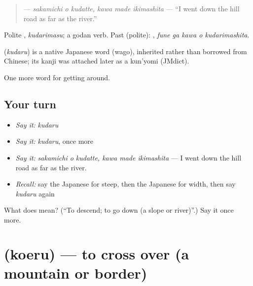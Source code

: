 \begin{quote}
\textbf{  } — \emph{sakamichi o kudatte, kawa made ikimashita} — \textquotedblleft{}I went down the hill road as far as the river.\textquotedblright{}
\end{quote}

Polite \textbf{}, \emph{kudarimasu}; a godan verb. Past (polite): \textbf{  }, \emph{fune ga kawa o kudarimashita}.

\begin{cousinweb}
\textbf{} (\emph{kudaru}) is a native Japanese word (wago), inherited rather than borrowed from Chinese; its kanji was attached later as a kun'yomi (JMdict).
\end{cousinweb}

\begin{grammarlens}[title={What you've built}]
One more word for getting around.
\end{grammarlens}

\subsection*{Your turn}
\begin{itemize}
\raggedright
  \item \emph{Say it:} \emph{kudaru}
  \item \emph{Say it:} \emph{kudaru}, once more
  \item \emph{Say it:} \emph{sakamichi o kudatte, kawa made ikimashita} — I went down the hill road as far as the river.
  \item \emph{Recall:} say the Japanese for steep, then the Japanese for width, then say \emph{kudaru} again
\end{itemize}

\begin{tcolorbox}[breakable,colback=teal!4,colframe=teal!35!black,title={Before you move on}]
What does  mean? (\textquotedblleft{}To descend; to go down (a slope or river)\textquotedblright{}.) Say it once more.
\end{tcolorbox}
\section[\texorpdfstring{\ja{こえる} (koeru)}{こえる (koeru)}]{ (koeru) — to cross over (a mountain or border)}

\label{lesson:JA-C394-koeru}



